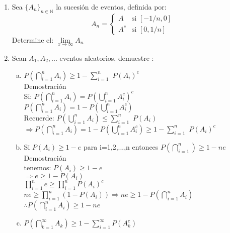 \documentclass[12pt]{article}
\begin{document}
\begin{enumerate}
\item Sea $\{A_n\}_{n\in\mathbb{N}}$ la sucesión de eventos, definida por:
\[A_n = \begin{cases} 
  A  & \mbox{si } \left[-1/n,0\right]  \\[0.5cm]
  A^c  & \mbox{si } \left[0,1/n\right] \end{cases} \]
Determine el: $\lim\limits_{x \to \infty}A_n$

\item Sean $A_1,A_2,...$ eventos aleatorios, demuestre :
\begin{enumerate}[a)]
\item $P\left(\displaystyle\bigcap_{i=1}^{n}{A_i}\right)\geq 1-\displaystyle\sum_{i=1}^{n}$ $P\left(A_{i}\right)^c$\\[0.2cm]
Demostración\\[0.2cm]
Si: $P\left(\displaystyle\bigcap_{i=1}^{n}{A_i}\right)= P\left(\displaystyle\bigcup_{i=1}^{n}{A_i^c}\right)^c$\\[0.2cm]
$P\left(\displaystyle\bigcap_{i=1}^{n}{A_i}\right)= 1- P\left(\displaystyle\bigcup_{i=1}^{n}{A_i^c}\right)$\\[0.2cm]
Recuerde: $P\left(\displaystyle\bigcup_{i=1}^{n}{A_i}\right) \leqslant\displaystyle\sum_{i=1}^{n}$ $P\left(A_{i}\right)$\\[0.2cm]
$\Rightarrow P\left(\displaystyle\bigcap_{i=1}^{n}{A_i}\right)= 1- P\left(\displaystyle\bigcup_{i=1}^{n}{A_i^c}\right) \geqslant 1-\displaystyle\sum_{i=1}^{n}$ $P\left(A_{i}\right)^c $

\item Si $P\left(A_{i}\right) \geq 1-e$ para i=1,2,...,n entonces $P\left(\displaystyle\bigcap_{i=1}^{n}\right)\geq 1-ne$\\[0.2cm]

Demostración\\[0.2cm]
tenemos: $P\left(A_{i}\right)\geqslant 1-e$\\[0.2cm]
	$\Rightarrow e \geqslant 1-P\left(A_{i}\right)$\\[0.2cm]
	$ \displaystyle\prod_{i=1}^{n}e \geqslant \displaystyle\prod_{i=1}^{n}P\left(A_{i}\right)^c$\\[0.2cm]
$ne \geqslant \displaystyle\prod_{i=1}^{n}\left(1- P{\left(A_{i}\right)}\right)\Rightarrow ne\geqslant 1-P\left(\displaystyle\bigcap_{i=1}^{n}A_i\right)$ \\[0.2cm]
$\therefore P\left(\displaystyle\bigcap_{i=1}^{n}A_i\right)\geqslant 1-ne $
			 
		
\item $P\left(\displaystyle\bigcap_{k=1}^{\infty}{A_k}\right) \geq 1-\displaystyle\sum_{i=1}^{\infty}P\left(A_{k}^{c}\right) $
\end{enumerate}


\end{enumerate}
\end{document}
